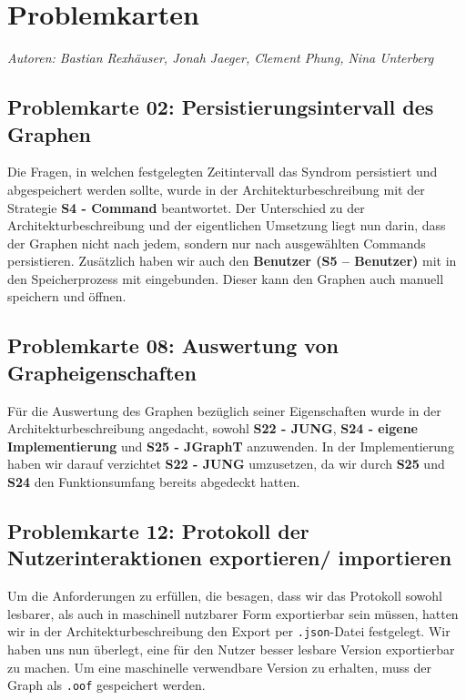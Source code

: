 \documentclass[enabledeprecatedfontcommands,fontsize=11pt,paper=a4,twoside]{scrartcl}
\newcounter{one}
\newcounter{two}[one]
\begin{document}
\section{Problemkarten}
\emph{Autoren: Bastian Rexhäuser, Jonah Jaeger, Clement Phung, Nina Unterberg}

\subsection{Problemkarte 02: Persistierungsintervall des Graphen}
Die Fragen, in welchen festgelegten Zeitintervall das Syndrom persistiert und abgespeichert werden sollte, wurde in der Architekturbeschreibung mit der Strategie \textbf{S4 - Command} beantwortet. Der Unterschied zu der Architekturbeschreibung und der eigentlichen Umsetzung liegt nun darin, dass der Graphen nicht nach jedem, sondern nur nach ausgewählten Commands persistieren. Zusätzlich haben wir auch den \textbf{Benutzer (S5 – Benutzer)} mit in den Speicherprozess mit eingebunden. Dieser kann den Graphen auch manuell speichern und öffnen. \\

\subsection{Problemkarte 08: Auswertung von Grapheigenschaften}
Für die Auswertung des Graphen bezüglich seiner Eigenschaften wurde in der Architekturbeschreibung angedacht, sowohl \textbf{S22 - JUNG}, \textbf{S24 - eigene Implementierung} und \textbf{S25 - JGraphT} anzuwenden. In der Implementierung haben wir darauf verzichtet \textbf{S22 - JUNG} umzusetzen, da wir durch \textbf{S25} und \textbf{S24} den Funktionsumfang bereits abgedeckt hatten. \\

\subsection{Problemkarte 12: Protokoll der Nutzerinteraktionen exportieren/ importieren}
Um die Anforderungen zu erfüllen, die besagen, dass wir das Protokoll sowohl lesbarer, als auch in maschinell nutzbarer Form exportierbar sein müssen, hatten wir in der Architekturbeschreibung den Export per \texttt{.json}-Datei festgelegt. Wir haben uns nun überlegt, eine für den Nutzer besser lesbare Version exportierbar zu machen. Um eine maschinelle verwendbare Version zu erhalten, muss der Graph als \texttt{.oof} gespeichert werden.\\
\end{document}
